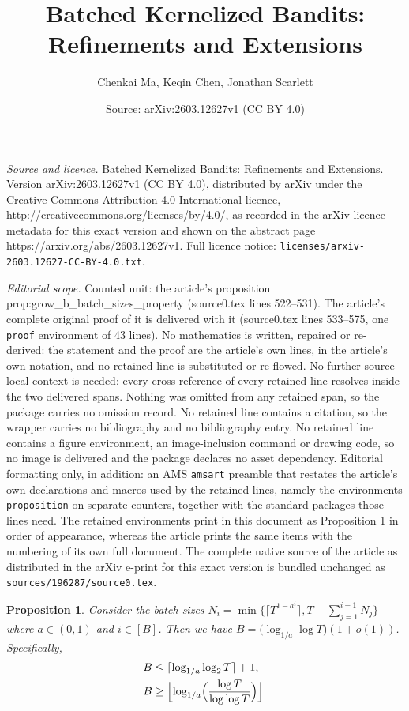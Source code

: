 \documentclass[10pt,a4paper]{amsart}
\title{Batched Kernelized Bandits: Refinements and Extensions}
\author{Chenkai Ma, Keqin Chen, Jonathan Scarlett}
\date{Source: arXiv:2603.12627v1 (CC BY 4.0)}
\newtheorem{proposition}{Proposition}
\begin{document}
\maketitle

\noindent\emph{Source and licence.} Batched Kernelized Bandits: Refinements and Extensions. Version arXiv:2603.12627v1 (CC BY 4.0), distributed by arXiv under the Creative Commons Attribution 4.0 International licence, http://creativecommons.org/licenses/by/4.0/, as recorded in the arXiv licence metadata for this exact version and shown on the abstract page https://arxiv.org/abs/2603.12627v1. Full licence notice: \texttt{licenses/arxiv-2603.12627-CC-BY-4.0.txt}.\par\smallskip

\noindent\textit{Editorial scope.} Counted unit: the article's proposition prop:grow\_b\_batch\_sizes\_property (source0.tex lines 522--531). The article's complete original proof of it is delivered with it (source0.tex lines 533--575, one \texttt{proof} environment of 43 lines). No mathematics is written, repaired or re-derived: the statement and the proof are the article's own lines, in the article's own notation, and no retained line is substituted or re-flowed.  No further source-local context is needed: every cross-reference of every retained line resolves inside the two delivered spans.  Nothing was omitted from any retained span, so the package carries no omission record.  No retained line contains a citation, so the wrapper carries no bibliography and no bibliography entry.  No retained line contains a figure environment, an image-inclusion command or drawing code, so no image is delivered and the package declares no asset dependency.  Editorial formatting only, in addition: an AMS \texttt{amsart} preamble that restates the article's own declarations and macros used by the retained lines, namely the environments \texttt{proposition} on separate counters, together with the standard packages those lines need.  The retained environments print in this document as Proposition 1 in order of appearance, whereas the article prints the same items with the numbering of its own full document.  The complete native source of the article as distributed in the arXiv e-print for this exact version is bundled unchanged as \texttt{sources/196287/source0.tex}.
\begin{proposition}
    \label{prop:grow_b_batch_sizes_property}
    Consider the batch sizes $N_i = \min \bigl\{\lceil T^{1-a^i} \rceil, T-\sum_{j=1}^{i-1}N_j\bigr\}$ where $a\in(0,1)$ and $i\in [B]$. 
    Then we have $B = \bigl(\log_{1/a}\log T\bigr) (1+o(1)) $.
    Specifically,
    \begin{align}
        B & \leq \lceil \log_{1/a}\log_2 T \rceil + 1, \label{eq:B_upper_bound} \\
        B & \geq \Bigl\lfloor \log_{1/a}\Bigl(\frac{\log T}{\log\log T}\Bigr) \Bigr\rfloor. \label{eq:B_lower_bound}
    \end{align}
\end{proposition}
\end{document}
